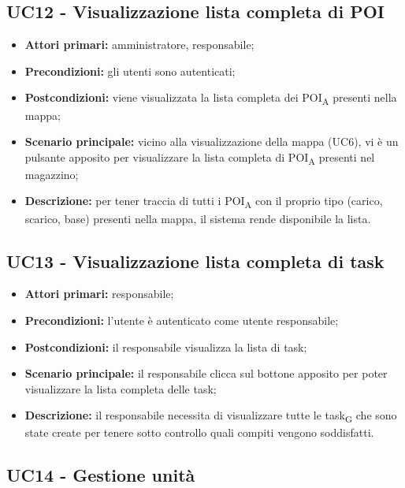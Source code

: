 \subsection{UC12 - Visualizzazione lista completa di POI}
\begin{itemize}
	\item 	\textbf{Attori primari:} amministratore, responsabile;
	\item 	\textbf{Precondizioni:} gli utenti sono autenticati;
	\item 	\textbf{Postcondizioni:} viene visualizzata la lista completa dei \acrshort{POI}\textsubscript{A} presenti nella mappa;
	\item 	\textbf{Scenario principale:} vicino alla visualizzazione della mappa (UC6), vi è un pulsante apposito per visualizzare la lista completa di \acrshort{POI}\textsubscript{A} presenti nel magazzino;
	\item 	\textbf{Descrizione:} per tener traccia di tutti i \acrshort{POI}\textsubscript{A} con il proprio tipo (carico, scarico, base) presenti nella mappa, il sistema rende disponibile la lista.

\end{itemize}

\subsection{UC13 - Visualizzazione lista completa di task}
\begin{itemize}
	\item 	\textbf{Attori primari:} responsabile;
	\item 	\textbf{Precondizioni:} l'utente è autenticato come utente responsabile;
	\item 	\textbf{Postcondizioni:} il responsabile visualizza la lista di task;
	\item 	\textbf{Scenario principale:} il responsabile clicca sul bottone apposito per poter visualizzare la lista completa delle task;
	\item 	\textbf{Descrizione:} il responsabile necessita di visualizzare tutte le \gls{task}\textsubscript{G} che sono state create per tenere sotto controllo quali compiti vengono soddisfatti.

\end{itemize}

\subsection{UC14 - Gestione unità}

